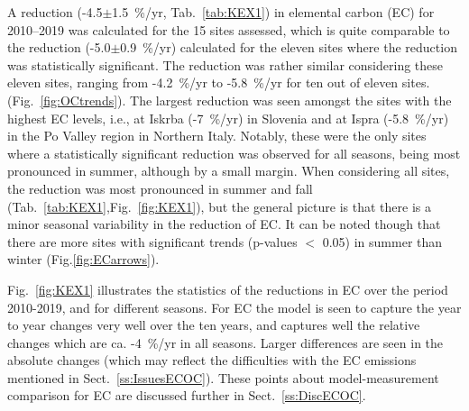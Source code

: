 %
A  reduction (-4.5$\pm$1.5~\%/yr, Tab.~\ref{tab:KEX1}) 
in elemental carbon (EC) for 2010--2019 was
calculated for the 15 sites assessed, which is
quite comparable to the reduction (-5.0$\pm$0.9~\%/yr)
calculated for the eleven sites where the reduction was statistically
significant. The reduction was rather similar considering these eleven
sites, ranging from -4.2~\%/yr to -5.8~\%/yr for ten out of eleven
sites. %
(Fig.~\ref{fig:OCtrends}). 
The largest reduction was seen amongst the sites with the
highest EC levels, i.e., at Iskrba (-7~\%/yr) in Slovenia and at Ispra
(-5.8~\%/yr) in the Po Valley region in Northern Italy. Notably, these
were the only sites where a statistically significant reduction was
observed for all seasons, being most pronounced in summer, although
by a small margin. When considering all sites, the reduction was most
pronounced in summer and fall (Tab.~\ref{tab:KEX1},Fig.~\ref{fig:KEX1}), but the general picture is
that there is a minor seasonal variability in the reduction of EC. It can be noted though that
there are more sites with significant trends (p-values $<$ 0.05)  in summer than winter (Fig.\ref{fig:ECarrows}).

Fig.~\ref{fig:KEX1} illustrates the statistics of the reductions in EC  over the period 2010-2019, and for different seasons. For EC the model is seen to capture the year to year changes very well over the ten years, and captures well the relative changes which are ca. -4~\%/yr in all seasons. Larger differences are seen in the absolute changes (which may reflect the difficulties with the EC emissions mentioned in Sect.~\ref{ss:IssuesECOC}).
These points about model-measurement comparison for EC are discussed further in Sect.~\ref{ss:DiscECOC}.

